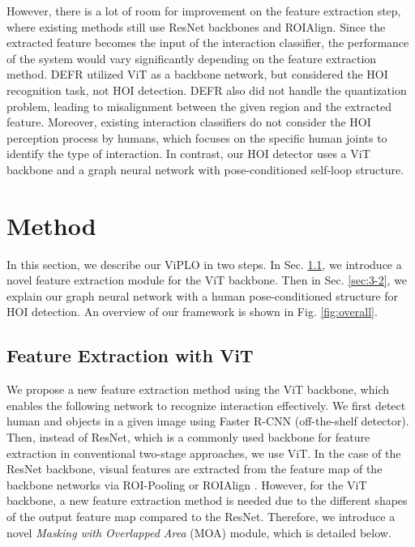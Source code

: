 \documentclass[10pt,twocolumn,letterpaper]{article}
\begin{document}
However, there is a lot of room for improvement on the feature extraction step, where existing methods still use ResNet backbones and ROIAlign. Since the extracted feature becomes the input of the interaction classifier, the performance of the system would vary significantly depending on the feature extraction method. DEFR \cite{jin2022overlooked} utilized ViT as a backbone network, but considered the HOI recognition task, not HOI detection.
DEFR also did not handle the quantization problem, leading to misalignment between the given region and the extracted feature.
Moreover, existing interaction classifiers do not consider the HOI perception process by humans, which focuses on the specific human joints to identify the type of interaction.
In contrast, our HOI detector uses a ViT backbone and a graph neural network with pose-conditioned self-loop structure. 



\section{Method}
\label{sec:3}

In this section, we describe our ViPLO in two steps. In Sec. \ref{sec:3-1}, we introduce a novel feature extraction module for the ViT backbone. Then in Sec. \ref{sec:3-2}, we explain our graph neural network with a human pose-conditioned structure for HOI detection. An overview of our framework is shown in Fig. \ref{fig:overall}.


\subsection{Feature Extraction with ViT}
\label{sec:3-1}
We propose a new feature extraction method using the ViT backbone, which enables the following network to recognize interaction effectively. We first detect human and objects in a given image using Faster R-CNN \cite{ren2015faster} (off-the-shelf detector). Then, instead of ResNet, which is a commonly used backbone for feature extraction in conventional two-stage approaches, we use ViT. In the case of the ResNet backbone, visual features are extracted from the feature map of the backbone networks via ROI-Pooling or ROIAlign \cite{he2017mask}. However, for the ViT backbone, a new feature extraction method is needed due to the different shapes of the output feature map compared to the ResNet. Therefore, we introduce a novel \textit{Masking with Overlapped Area} (MOA) module, which is detailed below.
\end{document}
